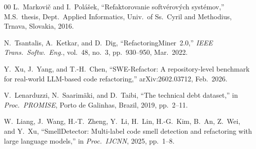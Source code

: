 \documentclass[conference]{IEEEtran}
\begin{document}
\begin{thebibliography}{00}
L.~Markovič and I.~Polášek,
``Refaktorovanie softvérových systémov,''
M.S.\ thesis, Dept.\ Applied Informatics,
Univ.\ of Ss.\ Cyril and Methodius, Trnava, Slovakia, 2016.

N.~Tsantalis, A.~Ketkar, and D.~Dig,
``RefactoringMiner~2.0,''
\emph{IEEE Trans.\ Softw.\ Eng.}, vol.~48, no.~3, pp.~930--950, Mar.\ 2022.

Y.~Xu, J.~Yang, and T.-H.~Chen,
``SWE-Refactor: A repository-level benchmark for real-world LLM-based
code refactoring,''
arXiv:2602.03712, Feb.\ 2026.

V.~Lenarduzzi, N.~Saarim{\"a}ki, and D.~Taibi,
``The technical debt dataset,''
in \emph{Proc.\ PROMISE}, Porto de Galinhas, Brazil, 2019, pp.~2--11.

W.~Liang, J.~Wang, H.-T.~Zheng, Y.~Li, H.~Lin, H.-G.~Kim,
B.~An, Z.~Wei, and Y.~Xu,
``SmellDetector: Multi-label code smell detection and refactoring with
large language models,''
in \emph{Proc.\ IJCNN}, 2025, pp.~1--8.

\end{thebibliography}
\end{document}
